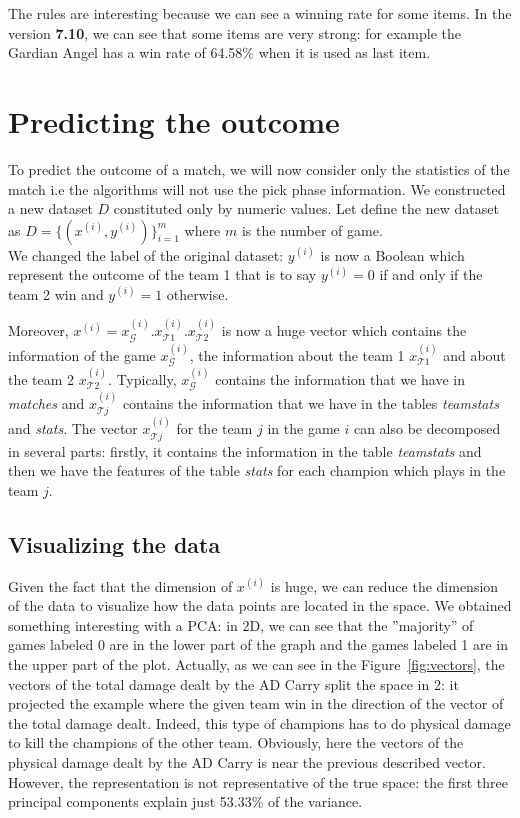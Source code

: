 \documentclass{article}
\def\version{\textbf{7.10}}
\def\database{D}
\begin{document}
The rules are interesting because we can see a winning rate for some items. In the version \version, we can see that some items are very strong: for example the Gardian Angel has a win rate of 64.58\% when it is used as last item.

\section{Predicting the outcome}
To predict the outcome of a match, we will now consider only the statistics of the match i.e the algorithms will not use the pick phase information. We constructed a new dataset $\database$ constituted only by numeric values. Let define the new dataset as $\database=\{(x^{(i)}, y^{(i)})\}_{i=1}^{m}$ where $m$ is the number of game.\\ 
We changed the label of the original dataset: $y^{(i)}$ is now a Boolean which represent the outcome of the team 1 that is to say $y^{(i)}=0$ if and only if the team 2 win and $y^{(i)}=1$ otherwise.

Moreover, $x^{(i)}=x_{\mathcal{G}}^{(i)}.x_{\mathcal{T}1}^{(i)}.x_{\mathcal{T}2}^{(i)}$ is now a huge vector which contains the information of the game $x_{\mathcal{G}}^{(i)}$, the information about the team 1 $x_{\mathcal{T}1}^{(i)}$ and about the team 2 $x_{\mathcal{T}2}^{(i)}$. Typically, $x_{\mathcal{G}}^{(i)}$ contains the information that we have in \emph{matches} and $x_{\mathcal{T}j}^{(i)}$ contains the information that we have in the tables \emph{teamstats} and \emph{stats}. The vector $x_{\mathcal{T}j}^{(i)}$ for the team $j$ in the game $i$ can also be decomposed in several parts: firstly, it contains the information in the table \emph{teamstats} and then we have the features of the table \emph{stats} for each champion which plays in the team $j$.

\subsection{Visualizing the data}

Given the fact that the dimension of $x^{(i)}$ is huge, we can reduce the dimension of the data to visualize how the data points are located in the space. We obtained something interesting with a PCA: in 2D, we can see that the ''majority'' of games labeled 0 are in the lower part of the graph and the games labeled 1 are in the upper part of the plot. Actually, as we can see in the Figure~\ref{fig:vectors}, the vectors  of the total damage dealt by the AD Carry split the space in 2: it projected the example where the given team win in the direction of the vector of the total damage dealt.  Indeed, this type of champions has to do physical damage to kill the champions of the other team. Obviously, here the vectors of the physical damage dealt by the AD Carry is near the previous described vector. However, the representation is not representative of the true space: the first three principal components explain just 53.33\% of the variance.
\end{document}
